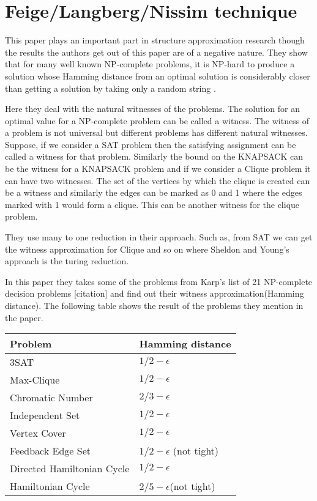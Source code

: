 \section{Feige/Langberg/Nissim technique}

This paper plays an important part in structure approximation research though the results the authors get out of this paper are of a negative nature. They show that for many well known NP-complete problems, it is NP-hard to produce a solution whose Hamming distance from an optimal solution is considerably closer than getting a solution by taking only a random string \cite{FLN00}. 

Here they deal with the natural witnesses of the problems. The solution for an optimal value for a NP-complete problem can be called a witness. The witness of a problem is not universal but different problems has different natural witnesses. Suppose, if we consider a SAT problem then the satisfying assignment can be called a witness for that problem. Similarly the bound on the KNAPSACK can be the witness for a KNAPSACK problem and if we consider a Clique problem it can have two witnesses. The set of the vertices by which the clique is created can be a witness and similarly the edges can be marked as 0 and 1 where the edges marked with 1 would form a clique. This can be another witness for the clique problem.

They use many to one reduction in their approach. Such as, from SAT we can get the witness approximation for Clique and so on where Sheldon and Young's \cite{SY03} approach is the turing reduction. 

In this paper they takes some of the problems from Karp's list of 21 NP-complete decision problems [citation] and find out their witness approximation(Hamming distance). The following table shows the result of the problems they mention in the paper. 

\begin{center}
    \begin{tabular}{ | l | l |}
    \hline
    Problem & Hamming distance \\ \hline
    3SAT & $1/2-\epsilon$ \\ \hline
    Max-Clique & $1/2-\epsilon$ \\ \hline
    Chromatic Number & $2/3-\epsilon$ \\ \hline
    Independent Set & $1/2-\epsilon$ \\ \hline
    Vertex Cover & $1/2-\epsilon$ \\ \hline
    Feedback Edge Set & $1/2-\epsilon$ (not tight)\\ \hline
    Directed Hamiltonian Cycle & $1/2-\epsilon$\\ \hline
    Hamiltonian Cycle & $2/5-\epsilon$(not tight)\\ 
    \hline
    \end{tabular}
\end{center}
 
